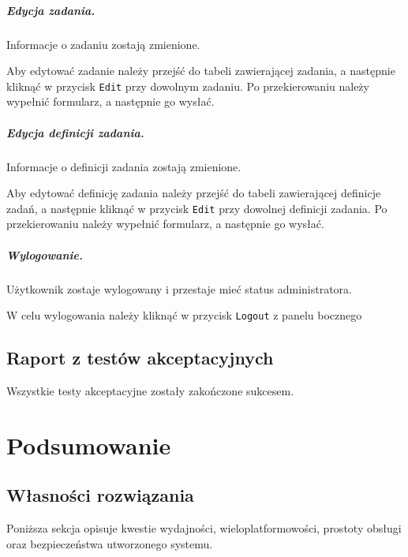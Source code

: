 \documentclass[a4paper,11pt,twoside]{report}
\theoremstyle{definition}
\begin{document}
            \paragraph{Edycja zadania.}  
                \noindent Informacje o zadaniu zostają zmienione.
                
                Aby edytować zadanie należy przejść do tabeli zawierającej zadania, a następnie kliknąć w przycisk \texttt{Edit} przy dowolnym zadaniu. Po przekierowaniu należy wypełnić formularz, a następnie go wysłać.

            \paragraph{Edycja definicji zadania.}    
                \noindent Informacje o definicji zadania zostają zmienione.
                
                Aby edytować definicję zadania należy przejść do tabeli zawierającej definicje zadań, a następnie kliknąć w przycisk \texttt{Edit} przy dowolnej definicji zadania. Po przekierowaniu należy wypełnić formularz, a następnie go wysłać.

            \paragraph{Wylogowanie.}
                \noindent Użytkownik zostaje wylogowany i przestaje mieć status administratora.

                W celu wylogowania należy kliknąć w przycisk \texttt{Logout} z panelu bocznego


            \subsubsection{}    
            
    \section{Raport z testów akceptacyjnych}
    
        Wszystkie testy akceptacyjne zostały zakończone sukcesem.

\chapter{Podsumowanie}
    \section{Własności rozwiązania}
        Poniższa sekcja opisuje kwestie wydajności, wieloplatformowości, prostoty obsługi oraz bezpieczeństwa utworzonego systemu.
        
\end{document}
